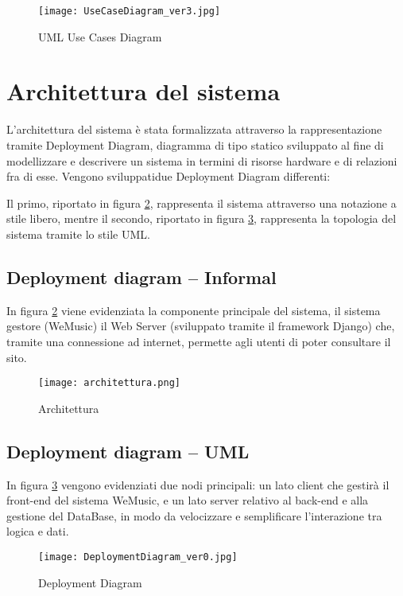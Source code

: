 \begin{figure}[H]
      \centering
      \texttt{[image: UseCaseDiagram\_ver3.jpg]}
      \caption{UML Use Cases Diagram}
      \label{fig-uml-use-cases}
\end{figure}


\newpage
\section{Architettura del sistema}
L'architettura del sistema è stata formalizzata attraverso la rappresentazione tramite Deployment Diagram, diagramma di tipo statico 
sviluppato al fine di modellizzare e descrivere un sistema in termini di risorse hardware e di relazioni fra di esse.
Vengono sviluppatidue Deployment Diagram differenti:

Il primo, riportato in figura \ref{architettura}, rappresenta il sistema
attraverso una notazione a stile libero, mentre il secondo, riportato in figura \ref{dep_diagram}, rappresenta
la topologia del sistema tramite lo stile UML. 

\vspace{2cm}

\subsection{Deployment diagram -- Informal}
In figura \ref{architettura} viene evidenziata la componente principale del sistema, il sistema gestore (WeMusic)
il Web Server (sviluppato tramite il framework Django) che, tramite una connessione ad internet, permette 
agli utenti di poter consultare il sito.
\begin{figure}[H]
      \centering
      \texttt{[image: architettura.png]}
      \caption{Architettura}
      \label{architettura}
\end{figure}


\newpage
\subsection{Deployment diagram -- UML}
In figura \ref{dep_diagram} vengono evidenziati due nodi principali: 
un lato client che gestirà il front-end del sistema WeMusic, e un lato server relativo 
al back-end e alla gestione del DataBase, in modo da velocizzare e semplificare l'interazione tra logica e dati. 
\begin{figure}[H]
    \centering
    \texttt{[image: DeploymentDiagram\_ver0.jpg]}
    \caption{Deployment Diagram}
    \label{dep_diagram}
\end{figure}


